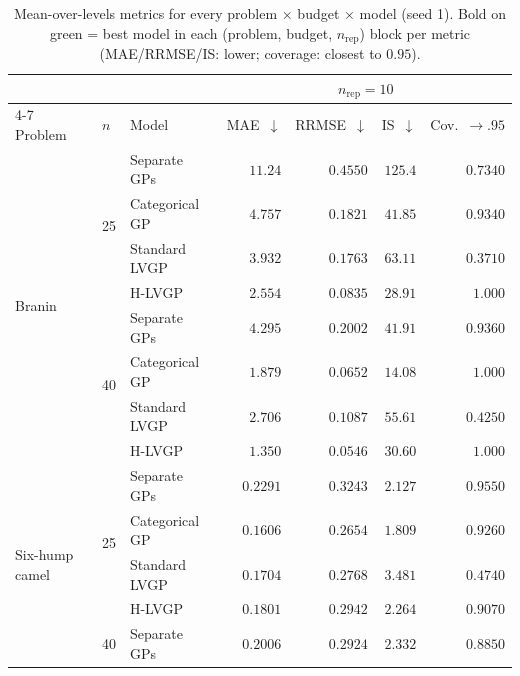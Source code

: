 \begin{table}[htbp]
\centering
\small
\setlength{\tabcolsep}{3.5pt}
\setlength{\fboxsep}{1.5pt}
\caption{Mean-over-levels metrics for every problem $\times$ budget $\times$ model (seed 1). Bold on green = best model in each (problem, budget, $n_{\mathrm{rep}}$) block per metric (MAE/RRMSE/IS: lower; coverage: closest to $0.95$).}
\label{tab:summary}
\begin{tabular}{lllrrrr}
\toprule
 & & & \multicolumn{4}{c}{$n_{\mathrm{rep}}=10$} \\
\cmidrule(lr){4-7}
Problem & $n$ & Model & MAE~$\downarrow$ & RRMSE~$\downarrow$ & IS~$\downarrow$ & Cov.~$\to.95$ \\
\midrule
\multirow{8}{*}{Branin} & \multirow{4}{*}{25} & Separate GPs & $11.24$ & $0.4550$ & $125.4$ & $0.7340$ \\
 &  & Categorical GP & $4.757$ & $0.1821$ & $41.85$ & \colorbox{green!20}{\boldmath$0.9340$} \\
 &  & Standard LVGP & $3.932$ & $0.1763$ & $63.11$ & $0.3710$ \\
 &  & H-LVGP & \colorbox{green!20}{\boldmath$2.554$} & \colorbox{green!20}{\boldmath$0.0835$} & \colorbox{green!20}{\boldmath$28.91$} & $1.000$ \\
\cmidrule(lr){2-7}
 & \multirow{4}{*}{40} & Separate GPs & $4.295$ & $0.2002$ & $41.91$ & \colorbox{green!20}{\boldmath$0.9360$} \\
 &  & Categorical GP & $1.879$ & $0.0652$ & \colorbox{green!20}{\boldmath$14.08$} & $1.000$ \\
 &  & Standard LVGP & $2.706$ & $0.1087$ & $55.61$ & $0.4250$ \\
 &  & H-LVGP & \colorbox{green!20}{\boldmath$1.350$} & \colorbox{green!20}{\boldmath$0.0546$} & $30.60$ & $1.000$ \\
\midrule
\multirow{8}{*}{Six-hump camel} & \multirow{4}{*}{25} & Separate GPs & $0.2291$ & $0.3243$ & $2.127$ & \colorbox{green!20}{\boldmath$0.9550$} \\
 &  & Categorical GP & \colorbox{green!20}{\boldmath$0.1606$} & \colorbox{green!20}{\boldmath$0.2654$} & \colorbox{green!20}{\boldmath$1.809$} & $0.9260$ \\
 &  & Standard LVGP & $0.1704$ & $0.2768$ & $3.481$ & $0.4740$ \\
 &  & H-LVGP & $0.1801$ & $0.2942$ & $2.264$ & $0.9070$ \\
\cmidrule(lr){2-7}
 & \multirow{4}{*}{40} & Separate GPs & $0.2006$ & $0.2924$ & $2.332$ & $0.8850$ \\

\end{tabular}
\end{table}
